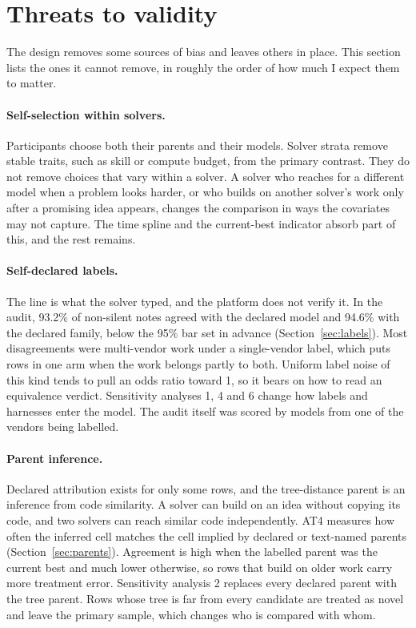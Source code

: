 \section{Threats to validity}
\label{sec:threats}

The design removes some sources of bias and leaves others in place.
This section lists the ones it cannot remove, in roughly the order of how much I expect them to matter.

\paragraph{Self-selection within solvers.}
Participants choose both their parents and their models.
Solver strata remove stable traits, such as skill or compute budget, from the primary contrast.
They do not remove choices that vary within a solver.
A solver who reaches for a different model when a problem looks harder, or who builds on another solver's work only after a promising idea appears, changes the comparison in ways the covariates may not capture.
The time spline and the current-best indicator absorb part of this, and the rest remains.

\paragraph{Self-declared labels.}
The  line is what the solver typed, and the platform does not verify it.
In the audit, 93.2\% of non-silent notes agreed with the declared model and 94.6\% with the declared family, below the 95\% bar set in advance (Section~\ref{sec:labels}).
Most disagreements were multi-vendor work under a single-vendor label, which puts rows in one arm when the work belongs partly to both.
Uniform label noise of this kind tends to pull an odds ratio toward 1, so it bears on how to read an equivalence verdict.
Sensitivity analyses 1, 4 and 6 change how labels and harnesses enter the model.
The audit itself was scored by models from one of the vendors being labelled.

\paragraph{Parent inference.}
Declared attribution exists for only some rows, and the tree-distance parent is an inference from code similarity.
A solver can build on an idea without copying its code, and two solvers can reach similar code independently.
AT4 measures how often the inferred cell matches the cell implied by declared or text-named parents (Section~\ref{sec:parents}).
Agreement is high when the labelled parent was the current best and much lower otherwise, so rows that build on older work carry more treatment error.
Sensitivity analysis 2 replaces every declared parent with the tree parent.
Rows whose tree is far from every candidate are treated as novel and leave the primary sample, which changes who is compared with whom.

